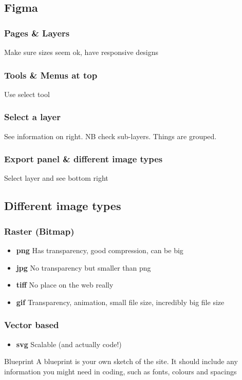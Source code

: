 \subsection{Figma}


\subsubsection{Pages \& Layers}

Make sure sizes seem ok, have responsive designs

\subsubsection{Tools \& Menus at top}

Use select tool

\subsubsection{Select a layer}

See information on right. NB check sub-layers. Things are grouped.

\subsubsection{Export panel \& different image types}

Select layer and see bottom right

\subsection{Different image types}

\subsubsection{Raster (Bitmap)}

\begin{itemize}
    \item \textbf{png} Has transparency, good compression, can be big
    \item \textbf{jpg} No transparency but smaller than png
    \item \textbf{tiff} No place on the web really
    \item \textbf{gif} Transparency, animation, small file size, incredibly big file size
\end{itemize}

\subsubsection{Vector based}

\begin{itemize}
    \item \textbf{svg} Scalable (and actually code!)
\end{itemize}

\begin{infobox}{Blueprint}
    A blueprint is your own sketch of the site. It should include any information you might need in coding, such as fonts, colours and spacings
\end{infobox}

